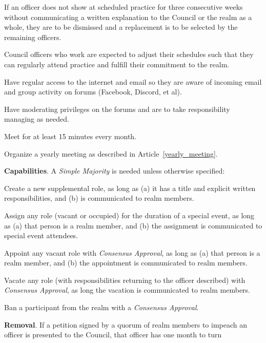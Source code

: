 \documentclass[12pt]{article}
\begin{document}
\begin{level}
\begin{level}
\begin{level}
\begin{level}
                    \item If an officer does not show at scheduled practice for three consecutive weeks without communicating a written explanation to the Council or the realm as a whole, they are to be dismissed and a replacement is to be selected by the remaining officers. 
                    \item Council officers who work are expected to adjust their schedules such that they can regularly attend practice and fulfill their commitment to the realm.
                \end{level}   
                \item Have regular access to the internet and email so they are aware of incoming email and group activity on forums (Facebook, Discord, et al).
                \item Have moderating privileges on the forums and are to take responsibility managing as needed.
                \item Meet for at least 15 minutes every month.
                \item Organize a yearly meeting as described in Article~\ref{yearly_meeting}.
            \end{level}
            \item \textbf{Capabilities}. A \emph{Simple Majority} is needed unless otherwise specified:
            \begin{level}
                \item Create a new supplemental role, as long as (a) it has a title and explicit written responsibilities, and (b) is communicated to realm members.
                \item Assign any role (vacant or occupied) for the duration of a special event, as long as (a) that person is a realm member, and (b) the assignment is communicated to special event attendees.
                \item Appoint any vacant role with \emph{Consensus Approval}, as long as (a) that person is a realm member, and (b) the appointment is communicated to realm members.
                \item Vacate any role (with responsibilities returning to the officer described) with \emph{Consensus Approval}, as long the vacation is communicated to realm members.
                \item Ban a participant from the realm with a \emph{Consensus Approval}.
            \end{level}
        \item \textbf{Removal}. If a petition signed by a quorum of realm members to impeach an officer is presented to the Council, that officer has one month to turn 

\end{level}
\end{level}
\end{document}
